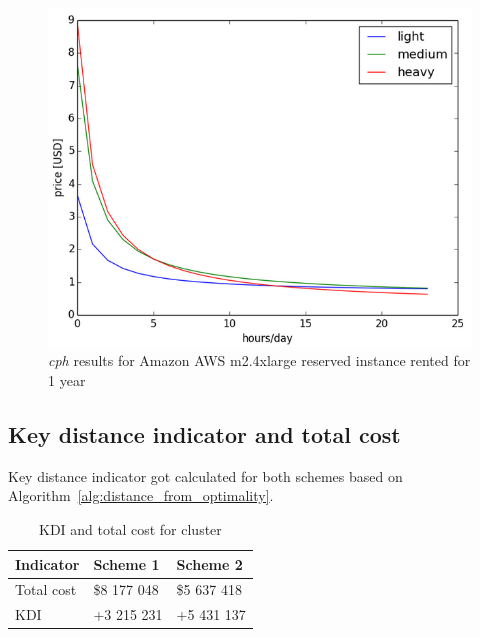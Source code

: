 \documentclass[]{final_report}
\begin{document}
\begin{figure}[H]
  \includegraphics[width=\linewidth]{figures/m2_4xlarge}
  \caption{\textit{cph} results for Amazon AWS m2.4xlarge reserved instance rented for 1 year~\cite{AWS:light}~\cite{AWS:medium}~\cite{AWS:heavy}}
  \label{fig:m2_4xlarge}
\end{figure}

\subsection{Key distance indicator and total cost}

Key distance indicator got calculated for both schemes based on Algorithm~\ref{alg:distance_from_optimality}.

\begin{table}[h]
\begin{center}
    \begin{tabular}{| l | l | l |}
    \hline
    Indicator & Scheme 1 & Scheme 2 \\
    \hline
    Total cost & \$8 177 048 & \$5 637 418 \\
    \hline
    KDI & +3 215 231 & +5 431 137 \\
    \hline
    \end{tabular}
\end{center}
\caption{KDI and total cost for cluster}
\label{tab:kdi_and_cost}
\end{table}
\end{document}
